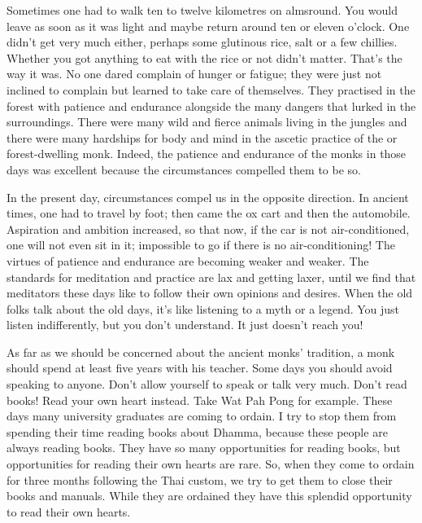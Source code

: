 Sometimes one had to walk ten to twelve kilometres on almsround. You would leave as soon as it was light and maybe return around ten or eleven o'clock. One didn't get very much either, perhaps some glutinous rice, salt or a few chillies. Whether you got anything to eat with the rice or not didn't matter. That's the way it was. No one dared complain of hunger or fatigue; they were just not inclined to complain but learned to take care of themselves. They practised in the forest with patience and endurance alongside the many dangers that lurked in the surroundings. There were many wild and fierce animals living in the jungles and there were many hardships for body and mind in the ascetic practice of the  or forest-dwelling monk. Indeed, the patience and endurance of the monks in those days was excellent because the circumstances compelled them to be so.

In the present day, circumstances compel us in the opposite direction. In ancient times, one had to travel by foot; then came the ox cart and then the automobile. Aspiration and ambition increased, so that now, if the car is not air-conditioned, one will not even sit in it; impossible to go if there is no air-conditioning! The virtues of patience and endurance are becoming weaker and weaker. The standards for meditation and practice are lax and getting laxer, until we find that meditators these days like to follow their own opinions and desires. When the old folks talk about the old days, it's like listening to a myth or a legend. You just listen indifferently, but you don't understand. It just doesn't reach you!

As far as we should be concerned about the ancient monks' tradition, a monk should spend at least five years with his teacher. Some days you should avoid speaking to anyone. Don't allow yourself to speak or talk very much. Don't read books! Read your own heart instead. Take Wat Pah Pong for example. These days many university graduates are coming to ordain. I try to stop them from spending their time reading books about Dhamma, because these people are always reading books. They have so many opportunities for reading books, but opportunities for reading their own hearts are rare. So, when they come to ordain for three months following the Thai custom, we try to get them to close their books and manuals. While they are ordained they have this splendid opportunity to read their own hearts.

